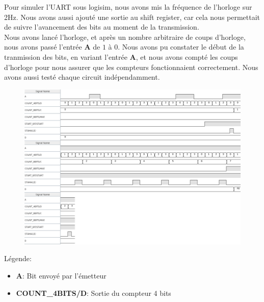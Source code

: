 \documentclass[a4paper]{article} %
\begin{document}
\begin{tcolorbox}[colframe=Monokaimagenta,colback=white]

Pour simuler l'UART sous logisim, nous avons mis la fréquence de l'horloge sur 2Hz. Nous avons aussi ajouté une sortie au shift register, car cela nous permettait de suivre l'avancement des bits au moment de la transmission.\\
Nous avons lancé l'horloge, et après un nombre arbitraire de coups d'horloge, nous avons passé l'entrée \textbf{A} de $1$ à $0$. Nous avons pu constater le début de la tranmission des bits, en variant l'entrée \textbf{A}, et nous avons compté les coups d'horloge pour nous assurer que les compteurs fonctionnaient correctement.
Nous avons aussi testé chaque circuit indépendamment.
\\
\begin{figure}[H]
\centering
    \includegraphics[width=1\textwidth]{src/CHRONO_UART_OK.png}
    \label{fig:chronoUART}
\end{figure}
Légende:
\begin{itemize}
    \item     \textbf{A}: Bit envoyé par l'émetteur
    \item     \textbf{COUNT\_4BITS/D}: Sortie du compteur 4 bits

\end{itemize}
\end{tcolorbox}
\end{document}
